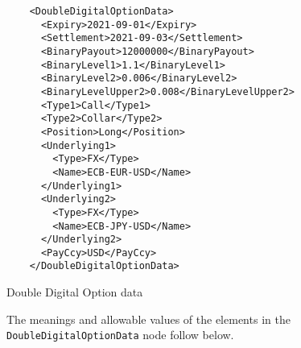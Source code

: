 \begin{listing}[H]
\begin{verbatim}
    <DoubleDigitalOptionData>
      <Expiry>2021-09-01</Expiry>
      <Settlement>2021-09-03</Settlement>
      <BinaryPayout>12000000</BinaryPayout>
      <BinaryLevel1>1.1</BinaryLevel1>
      <BinaryLevel2>0.006</BinaryLevel2>
      <BinaryLevelUpper2>0.008</BinaryLevelUpper2>
      <Type1>Call</Type1>
      <Type2>Collar</Type2>
      <Position>Long</Position>
      <Underlying1>
        <Type>FX</Type>
        <Name>ECB-EUR-USD</Name>
      </Underlying1>
      <Underlying2>
        <Type>FX</Type>
        <Name>ECB-JPY-USD</Name>
      </Underlying2>
      <PayCcy>USD</PayCcy>
    </DoubleDigitalOptionData>
\end{verbatim}
\caption{Double Digital Option data}
\label{lst:doubledigitaloption_data}
\end{listing}

The meanings and allowable values of the elements in the \verb+DoubleDigitalOptionData+  node follow below.

